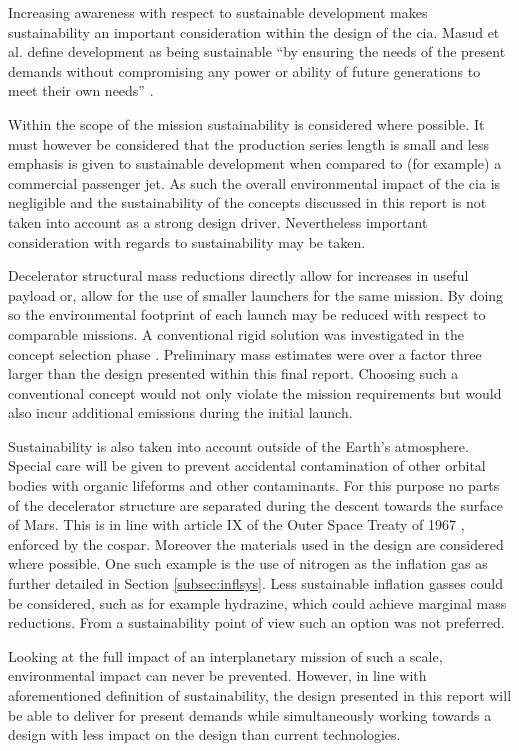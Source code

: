 Increasing awareness with respect to sustainable development makes sustainability an important consideration within the design of the \gls{cia}. Masud et al. define development as being sustainable  ``by ensuring the needs of the present demands without compromising any power or ability of future generations to meet their own needs'' \cite[p.85]{Masud2011}. 

Within the scope of the mission sustainability is considered where possible. It must however be considered that the production series length is small and less emphasis is given to sustainable development when compared to (for example) a commercial passenger jet. As such the overall environmental impact of the \gls{cia} is negligible and the sustainability of the concepts discussed in this report is not taken into account as a strong design driver. Nevertheless important consideration with regards to sustainability may be taken. 

Decelerator structural mass reductions directly allow for increases in useful payload or, allow for the use of smaller launchers for the same mission. By doing so the environmental footprint of each launch may be reduced with respect to comparable missions. A conventional rigid solution was investigated in the concept selection phase \cite{Balasooriyan2015b}. Preliminary mass estimates were over a factor three larger than the design presented within this final report. Choosing such a conventional concept would not only violate the mission requirements but would also incur additional emissions during the initial launch.

Sustainability is also taken into account outside of the Earth's atmosphere. Special care will be given to prevent accidental contamination of other orbital bodies with organic lifeforms and other contaminants. For this purpose no parts of the decelerator structure are separated during the descent towards the surface of Mars. This is in line with article IX of the Outer Space Treaty of 1967 \cite{UnitedNations2008}, enforced by the \gls{cospar}. Moreover the materials used in the design are considered where possible. One such example is the use of nitrogen as the inflation gas as further detailed in Section \ref{subsec:inflsys}. Less sustainable inflation gasses could be considered, such as for example hydrazine, which could achieve marginal mass reductions. From a sustainability point of view such an option was not preferred.

Looking at the full impact of an interplanetary mission of such a scale, environmental impact can never be prevented. However, in line with aforementioned definition of sustainability, the design presented in this report will be able to deliver for present demands while simultaneously working towards a design with less impact on the design than current technologies.

